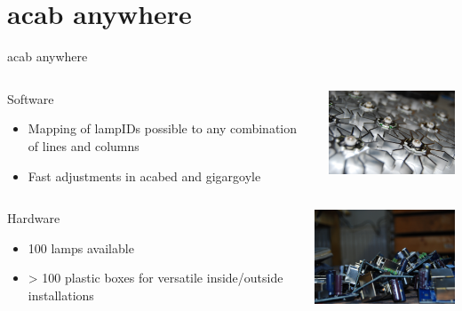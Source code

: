 \documentclass{beamer}
\begin{document}
\section{acab anywhere}
  \begin{frame}{acab anywhere}
  \begin{columns}
    \begin{column}{5cm}
      \begin{block}{Software}
        \begin{itemize}
        \item Mapping of lampIDs possible to any combination of lines and columns\\
        \item Fast adjustments in acabed and gigargoyle
        \end{itemize}
      \end{block}
    \end{column}
    \begin{column}{5cm}
    \includegraphics[width=5cm]{bilder/handarbeit3.JPG}
    \end{column}
  \end{columns}
  \begin{columns}
    \begin{column}{5cm}
      \begin{block}{Hardware}
        \begin{itemize}
        \item 100 lamps available
        \item > 100 plastic boxes for versatile inside/outside installations
        \end{itemize}
      \end{block}
    \end{column}
    \begin{column}{5cm}
    \includegraphics[width=5cm]{bilder/handarbeit2.JPG}
    \end{column}
  \end{columns}
\end{frame}
\end{document}
